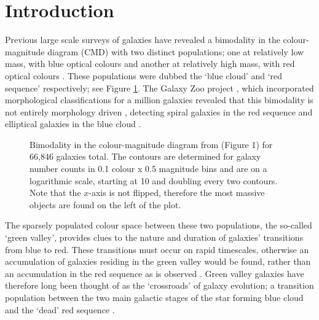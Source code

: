 \documentclass{mn2e}
\begin{document}
\section{Introduction}
Previous large scale surveys of galaxies have revealed a bimodality in the colour-magnitude diagram (CMD) with two distinct populations; one at relatively low mass, with blue optical colours and another at relatively high mass, with red optical colours \citep{Baldry04, Baldry06, Willmer06, BLB08, Brammer09}. These populations were dubbed the `blue cloud' and `red sequence' respectively; see Figure \ref{baldry}. The Galaxy Zoo project \citep{Lintott11}, which incorporated morphological classifications for a million galaxies revealed that this bimodality is not entirely morphology driven \citep{Bamford09, Skibba09}, detecting spiral galaxies in the red sequence \citep{Masters10} and elliptical galaxies in the blue cloud \citep{Sch09}.  

\begin{figure}
\caption{Bimodality in the colour-magnitude diagram from \citet{Baldry04} (Figure 1) for 66,846 galaxies total. The contours are determined for galaxy number counts in 0.1 colour x 0.5 magnitude bins and are on a logarithmic scale, starting at 10 and doubling every two contours. Note that the $x$-axis is not flipped, therefore the most massive objects are found on the left of the plot.}
\label{baldry}
\end{figure}


The sparsely populated colour space between these two populations, the so-called `green valley', provides clues to the nature and duration of galaxies' transitions from blue to red. These transitions must occur on rapid timescales, otherwise an accumulation of galaxies residing in the green valley would be found, rather than an accumulation in the red sequence as is observed \citep{Arnouts07, Martin07}. Green valley galaxies have therefore long been thought of as the `crossroads' of galaxy evolution; a transition population between the two main galactic stages of the star forming blue cloud and the `dead' red sequence \citep{Bell04, Wyder07, Schim07, Martin07, Faber07, Mendez11, Gonc12, Sch2014}. 
\end{document}
